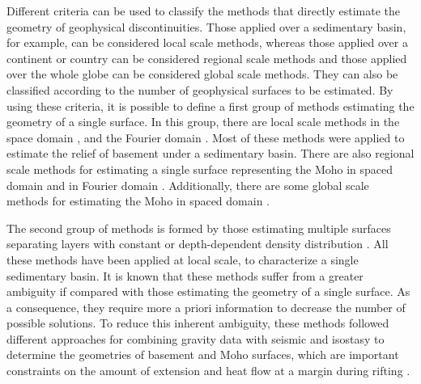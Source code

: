 \documentclass[manuscript]{geophysics}
\begin{document}
Different criteria can be used to classify the methods that directly estimate
the geometry of geophysical discontinuities.
Those applied over a sedimentary basin, for example, can be considered local scale methods,
whereas those applied over a continent or country can be considered regional scale methods
and those applied over the whole globe can be considered global scale methods.
They can also be classified according to the number of geophysical surfaces
to be estimated.
By using these criteria, it is possible to define a first group of methods
estimating the geometry of a single surface.
In this group, there are local scale methods in the space domain
\citep[e.g.,][]{bott1960, tanner1967, cordell-henderson1968, dyrelius-vogel1972, 
pedersen1977, richardson-macinnes1989, barbosa-etal1997, condi-etal1999, 
barbosa-etal1999, barbosa-etal1999b, silva-etal2006,  
chakravarthi-sundararajan2007, martins-etal2010, silva-etal2010, lima-etal2011, 
martins-etal2011, barnes-barraud2012, silva-etal2014, silva-santos2017},
and the Fourier domain
\citep[e.g.,][]{oldenburg1974, granser1987, reamer-ferguson1989, guspi1993}.
Most of these methods were applied to estimate the relief of basement under
a sedimentary basin.
There are also regional scale methods for estimating a single surface 
representing the Moho in spaced domain 
\citep[e.g.,][]{shin-etal2009, bagherbandi-eshagh2012, barzaghi-biagi2014, 
sampietro2015, uieda-barbosa2017} and in Fourier domain 
\citep[e.g.,][]{braitenberg-etal1997, braitenberg-zadro1999, vandermeijde-etal2013}.
Additionally, there are some global scale methods for estimating the Moho
in spaced domain
\citep[e.g.,][]{sunkel1985, sjoberg2009}.

The second group of methods is formed by those estimating multiple surfaces
separating layers with constant or depth-dependent density distribution 
\citep[e.g.,][]{condi-etal1999, camacho-etal2011, salem-etal2014, 
ferderer-etal2017, garcia-abdeslem2017, salem2017}.
All these methods have been applied at local scale, to characterize a single 
sedimentary basin.
It is known that these methods suffer from a greater ambiguity if compared with 
those estimating the geometry of a single surface.
As a consequence, they require more a priori information to
decrease the number of possible solutions. 
To reduce this inherent ambiguity, these methods followed different approaches
for combining gravity data with seismic and isostasy 
to determine the geometries of basement and Moho surfaces, which are important 
constraints on the amount of extension and heat flow at a margin during rifting
\citep{watts-fairhead1999}.
\end{document}
